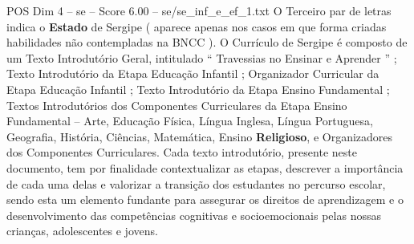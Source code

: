 \begin{textsample}{POS Dim 4 – se – Score 6.00 – se/se\_inf\_e\_ef\_1.txt}
O Terceiro par de letras indica o \textbf{Estado} de Sergipe ( aparece apenas nos casos em que forma criadas habilidades não contempladas na BNCC ).
O Currículo de Sergipe é composto de um Texto Introdutório Geral, intitulado “ Travessias no Ensinar e Aprender ” ; Texto Introdutório da Etapa Educação Infantil ; Organizador Curricular da Etapa Educação Infantil ; Texto Introdutório da Etapa Ensino Fundamental ; Textos Introdutórios dos Componentes Curriculares da Etapa Ensino Fundamental – Arte, Educação Física, Língua Inglesa, Língua Portuguesa, Geografia, História, Ciências, Matemática, Ensino \textbf{Religioso}, e Organizadores dos Componentes Curriculares.
Cada texto introdutório, presente neste documento, tem por finalidade contextualizar as etapas, descrever a importância de cada uma delas e valorizar a transição dos estudantes no percurso escolar, sendo esta um elemento fundante para assegurar os direitos de aprendizagem e o desenvolvimento das competências cognitivas e socioemocionais pelas nossas crianças, adolescentes e jovens.

\end{textsample}
